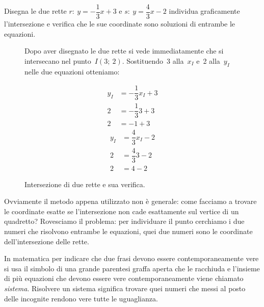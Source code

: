  \begin{esempio}
  Disegna le due rette \(r:~y = -\dfrac{1}{3} x +3\) e 
  \(s:~y = \dfrac{4}{3} x -2\) 
  individua graficamente l'intersezione e verifica che 
  le sue coordinate sono soluzioni di entrambe le equazioni.
\begin{inaccessibleblock}
 \begin{figure}[h]
 \centering
 \begin{minipage}[]{.49\textwidth}
 \intersezionea
 \end{minipage}
 \hfill
 \begin{minipage}[]{.49\textwidth}
Dopo aver disegnato le due rette si vede immediatamente che si intersecano 
nel punto~\(I(3;~2)\). 
Sostituendo~3 alla~\(x_I\) e~2 alla~\(y_I\) nelle due equazioni otteniamo:
\begin{multicols}{2}
\vspace*{-2.1em}
\begin{align*}
y_I &= -\dfrac{1}{3} x_I +3 \\
2 &= -\dfrac{1}{3} 3 +3 \\
2 &= -1 + 3
\end{align*} %
\begin{align*}
y_I &= \dfrac{4}{3} x_I -2 \\
2 &= \dfrac{4}{3} 3 -2 \\
2 &= 4 -2
\end{align*}
\end{multicols}
 \end{minipage}
\caption{Intersezione di due rette e sua verifica.}
\label{fig:intersezionea}
\end{figure}
\end{inaccessibleblock}
 \end{esempio}

Ovviamente il metodo appena utilizzato non è generale: come facciamo a trovare 
le coordinate esatte se l'intersezione non cade esattamente sul vertice di  
un quadretto? Rovesciamo il problema: per individuare il punto 
cerchiamo i due numeri che risolvono entrambe le equazioni, quei due numeri
sono le coordinate dell'intersezione delle rette.

In matematica per indicare che due frasi devono essere contemporaneamente 
vere si usa il simbolo di una grande parentesi graffa aperta che le racchiuda 
e l'insieme di più equazioni che devono essere vere contemporaneamente viene
chiamato \emph{sistema}. Risolvere un sistema significa trovare quei numeri 
che messi al posto delle incognite rendono vere tutte le uguaglianza.

